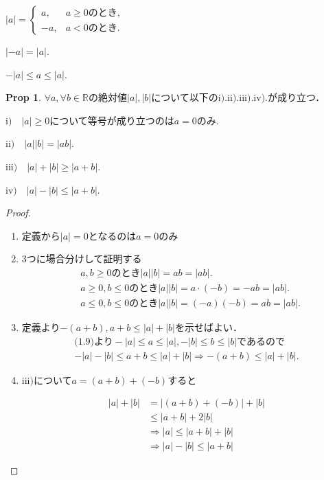\documentclass{ltjsarticle}
\theoremstyle{definition}
\newtheorem{prop}[thm]{Prop}
\theoremstyle{propcorollarystyle}
\theoremstyle{thmcorollarystyle}
\begin{document}
\noindent
{}
\hfill
$
|a| =
\begin{cases}
a, & a \geq 0 \text{のとき}, \\
-a, & a < 0 \text{のとき}.
\end{cases}
$
\hfill\null

\noindent
{}
\hfil
$|-a|=|a|$.

\noindent
{}
\hfil
$-|a| \le a \le |a|$.
\hfil
\par

\begin{prop}
  $\forall a,\forall b \in \mathbb{R}$の絶対値$|a|, |b|$について以下の$\mathrm{i}).\mathrm{ii}).\mathrm{iii}).\mathrm{iv}).$が成り立つ．\par
  $\mathrm{i}) \quad |a| \ge 0$について等号が成り立つのは$a=0$のみ.\par
  $\mathrm{ii}) \quad |a||b|=|ab|$.\par
  $\mathrm{iii}) \quad |a|+|b|\ge |a+b|$.\par
  $\mathrm{iv}) \quad |a| -|b| \le |a+b|$.\par
\end{prop}
\begin{proof}
  \begin{enumerate}[label={\roman*}),itemsep=1em]
    \item 定義から$|a|=0$となるのは$a=0$のみ
    \item 3つに場合分けして証明する
    \[
      \begin{aligned}
        & a,b \ge 0のとき|a||b|=ab=|ab|.\\
        & a \ge 0, b \le 0のとき|a||b|=a \cdot (-b)=-ab=|ab|.\\
        & a \le 0, b \le 0のとき|a||b|=(-a)(-b)=ab=|ab|.
      \end{aligned}
    \]
    \item 定義より$-(a+b), a+b \le |a|+|b|$を示せばよい．
      \begin{align*}
        \text{(1.9)より}-|a| \le a \le |a|, -|b| \le b \le |b|\text{であるので}\\
        -|a|-|b| \le a+b \le |a|+|b| \Rightarrow -(a+b) \le |a|+|b|.
      \end{align*}
    \item $\mathrm{iii})$について$a=(a+b)+(-b)$すると\par
      \begin{align*}
        |a|+|b| & =|(a+b)+(-b)|+|b|\\
        & \le |a+b|+2|b|\\
        & \Rightarrow |a|  \le |a+b|+|b|\\
        & \Rightarrow |a|-|b|  \le |a+b|
      \end{align*}
  \end{enumerate}
\end{proof}
\end{document}

